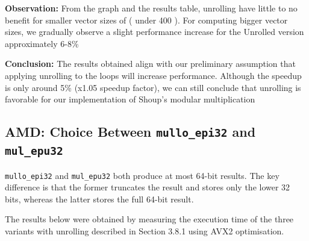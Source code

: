 \documentclass{article}
\newcommand{\pointlabel}[1]{\par\smallskip\noindent\textbf{\textcolor{accentorange}{#1:}} }
\begin{document}
\pointlabel{Observation}
From the graph and the results table, unrolling have little to no benefit for smaller vector sizes of ( under 400 ). For computing bigger vector sizes, we gradually observe a slight performance increase for the Unrolled version approximately 6-8\%

\pointlabel{Conclusion}The results obtained align with our preliminary assumption that applying unrolling to the loops will increase performance. Although the speedup is only around 5\% (x1.05 speedup factor), we can still conclude that unrolling is favorable for our implementation of Shoup's modular multiplication


\subsection{AMD: Choice Between \texttt{mullo\_epi32} and \texttt{mul\_epu32}}
\texttt{mullo\_epi32} and \texttt{mul\_epu32} both produce at most 64-bit results. The key difference is that the former truncates the result and stores only the lower 32 bits, whereas the latter stores the full 64-bit result.

The results below were obtained by measuring the execution time of the three variants with unrolling described in Section 3.8.1 using AVX2 optimisation.
\end{document}
